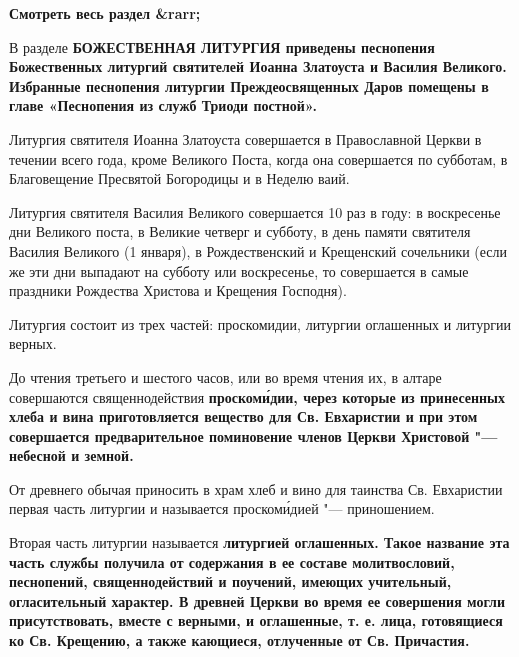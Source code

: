 


\bfseries Смотреть весь раздел &rarr;\normalfont{} 

 


В разделе \bfseries БОЖЕСТВЕННАЯ ЛИТУРГИЯ\normalfont{} приведены песнопения Божественных литургий святителей Иоанна Златоуста и Василия Великого. Избранные песнопения литургии Преждеосвященных Даров помещены в главе «Песнопения из служб Триоди постной».


Литургия святителя Иоанна Златоуста совершается в Православной Церкви в течении всего года, кроме Великого Поста, когда она совершается по субботам, в Благовещение Пресвятой Богородицы и в Неделю ваий.


Литургия святителя Василия Великого совершается 10 раз в году: в воскресенье дни Великого поста, в Великие четверг и субботу, в день памяти святителя Василия Великого (1 января), в Рождественский и Крещенский сочельники (если же эти дни выпадают на субботу или воскресенье, то совершается в самые праздники Рождества Христова и Крещения Господня).


Литургия состоит из трех частей: проскомидии, литургии оглашенных и литургии верных.


\mychapterending

 


До чтения третьего и шестого часов, или во время чтения их, в алтаре совершаются священнодействия \bfseries проскоми́дии\normalfont{}, через которые из принесенных хлеба и вина приготовляется вещество для Св. Евхаристии и при этом совершается предварительное поминовение членов Церкви Христовой "--- небесной и земной.


От древнего обычая приносить в храм хлеб и вино для таинства Св. Евхаристии первая часть литургии и называется проскоми́дией "--- приношением.


\mychapterending

 


Вторая часть литургии называется \bfseries литургией оглашенных\normalfont{}. Такое название эта часть службы получила от содержания в ее составе молитвословий, песнопений, священнодействий и поучений, имеющих учительный, огласительный характер. В древней Церкви во время ее совершения могли присутствовать, вместе с верными, и оглашенные, т. е. лица, готовящиеся ко Св. Крещению, а также кающиеся, отлученные от Св. Причастия.


